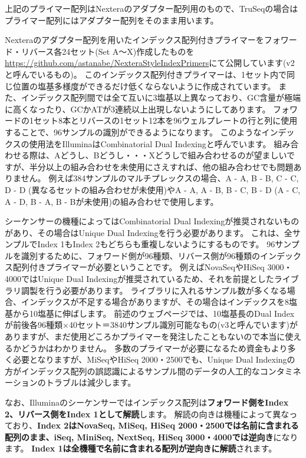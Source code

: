 \documentclass[titlepage,10pt,a4paper,uplatex]{jsbook}
\renewcommand{\textbf}[1]{{\bfseries\sffamily#1}}
\begin{document}
上記のプライマー配列はNexteraのアダプター配列用のもので、TruSeqの場合はプライマー配列にはアダプター配列をそのまま用います。

Nexteraのアダプター配列を用いたインデックス配列付きプライマーをフォワード・リバース各24セット(Set A～X)作成したものを\url{https://github.com/astanabe/NexteraStyleIndexPrimers}にて公開しています(v2と呼んでいるもの)。
このインデックス配列付きプライマーは、1セット内で同じ位置の塩基多様度ができるだけ低くならないように作成されています。
また、インデックス配列間では全て互いに3塩基以上異なっており、GC含量が極端に高くなったり、GCかATが3連続以上出現しないようにしてあります。
フォワードの1セット8本とリバースの1セット12本を96ウェルプレートの行と列に使用することで、96サンプルの識別ができるようになります。
このようなインデックスの使用法をIlluminaはCombinatorial Dual Indexingと呼んでいます。
組み合わせる際は、Aどうし、Bどうし・・・Xどうしで組み合わせるのが望ましいですが、半分以上の組み合わせを未使用にさえすれば、他の組み合わせでも問題ありません。
例えば384サンプルのマルチプレックスの場合、A - A, B - B, C - C, D - D (異なるセットの組み合わせが未使用)やA - A, A - B, B - C, B - D (A - C, A - D, B - A, B - Bが未使用)の組み合わせで使用します。

シーケンサーの機種によってはCombinatorial Dual Indexingが推奨されないものがあり、その場合はUnique Dual Indexingを行う必要があります。
これは、全サンプルでIndex 1もIndex 2もどちらも重複しないようにするものです。
96サンプルを識別するために、フォワード側が96種類、リバース側が96種類のインデックス配列付きプライマーが必要ということです。
例えばNovaSeqやHiSeq 3000・4000ではUnique Dual Indexingが推奨されているため、それを前提としたライブラリ調製を行う必要があります。
ライブラリに入れるサンプル数が多くなる場合、インデックスが不足する場合がありますが、その場合はインデックスを8塩基から10塩基に伸ばします。
前述のウェブページでは、10塩基長のDual Indexが前後各96種類×40セット＝3840サンプル識別可能なもの(v3と呼んでいます)がありますが、まだ使用どころかプライマーを発注したこともないので本当に使えるかどうかはわかりません。
多数のプライマーが必要になるため資金もより多く必要となりますが、MiSeqやHiSeq 2000・2500でも、Unique Dual Indexingの方がインデックス配列の誤認識によるサンプル間のデータの人工的なコンタミネーションのトラブルは減少します。

なお、Illuminaのシーケンサーではインデックス配列は\textbf{フォワード側をIndex 2、リバース側をIndex 1として解読}します。
解読の向きは機種によって異なっており、\textbf{Index 2はNovaSeq, MiSeq, HiSeq 2000・2500では名前に含まれる配列のまま、iSeq, MiniSeq, NextSeq, HiSeq 3000・4000では逆向き}になります。
\textbf{Index 1は全機種で名前に含まれる配列が逆向きに解読}されます。
\end{document}
